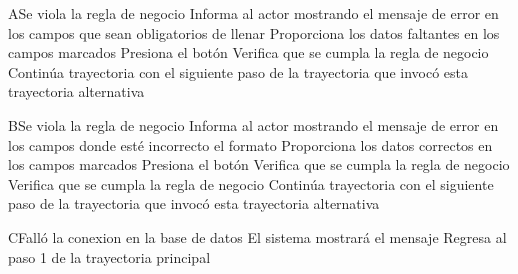 
\begin{UCtrayectoriaA}{A}{Se viola la regla de negocio }	
			\UCpaso[\UCsist] Informa al actor mostrando el mensaje de error  en los campos que sean obligatorios de llenar
			\UCpaso[\UCactor] Proporciona los datos faltantes en los campos marcados 
			\UCpaso[\UCactor] Presiona el botón  
			\UCpaso[\UCactor] Verifica que se cumpla la regla de negocio  
			\UCpaso[\UCsist] Continúa trayectoria con el siguiente paso de la trayectoria que invocó esta trayectoria alternativa
\end{UCtrayectoriaA}


\begin{UCtrayectoriaA}{B}{Se viola la regla de negocio }	
			\UCpaso[\UCsist] Informa al actor mostrando el mensaje de error  en los campos donde esté incorrecto el formato
			\UCpaso[\UCactor] Proporciona los datos correctos en los campos marcados 
			\UCpaso[\UCactor] Presiona el botón  
			\UCpaso[\UCsist] Verifica que se cumpla la regla de negocio  
			\UCpaso[\UCsist] Verifica que se cumpla la regla de negocio  
			\UCpaso[\UCsist] Continúa trayectoria con el siguiente paso de la trayectoria que invocó esta trayectoria alternativa
\end{UCtrayectoriaA}


\begin{UCtrayectoriaA}{C}{Falló la conexion en la base de datos}
			\UCpaso[\UCsist] El sistema mostrará el mensaje 
			\UCpaso[\UCsist] Regresa al paso 1 de la trayectoria principal  
\end{UCtrayectoriaA}


